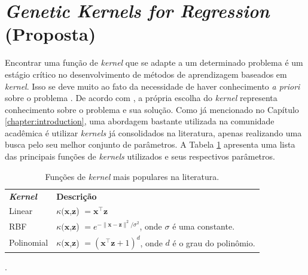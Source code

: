 
\section{\textit{Genetic Kernels for Regression} (Proposta)} \label{sec:gkr}
Encontrar uma função de \textit{kernel} que se adapte a um determinado problema é um estágio crítico no desenvolvimento de métodos de aprendizagem baseados em \textit{kernel}. Isso se deve muito ao fato da necessidade de haver conhecimento \textit{a priori} sobre o problema \cite{shawe2004}. De acordo com , a própria escolha do \textit{kernel} representa conhecimento sobre o problema e sua solução. Como já mencionado no Capítulo \ref{chapter:introduction}, uma abordagem bastante utilizada na comunidade acadêmica é utilizar \textit{kernels} já consolidados na literatura, apenas realizando uma busca pelo seu melhor conjunto de parâmetros. A Tabela \ref{tab:commom-kernels} apresenta uma lista das principais funções de \textit{kernels} utilizados e seus respectivos parâmetros.

\begin{table}[H]
    \caption{Funções de \textit{kernel} mais populares na literatura.}
    \begin{center} \label{tab:commom-kernels}
        \begin{tabular}{l@{\hskip 20pt}l}
            \hline\noalign{\smallskip}
            \textbf{\textit{Kernel}} & \textbf{Descrição} \\
            \noalign{\smallskip}
            \hline
            \noalign{\smallskip}
            Linear		& $\kappa({\mathbf x}$,${\mathbf z}$) $= \mathbf{x}^{\top}\mathbf{z}$ \\
            RBF	        & $\kappa({\mathbf x}$,${\mathbf z}$) $= e^{-\|\mathbf{x} - \mathbf{z}\|^2 / \sigma^2}$, onde $\sigma$ é uma constante. \\
            Polinomial	& $\kappa({\mathbf x}$,${\mathbf z}$) $= (\mathbf{x}^{\top}\mathbf{z} + 1)^d$, onde $d$ é o grau do polinômio. \\
            \hline
        \end{tabular}
    \end{center}
    \begin{center}
        .
    \end{center}
\end{table}

